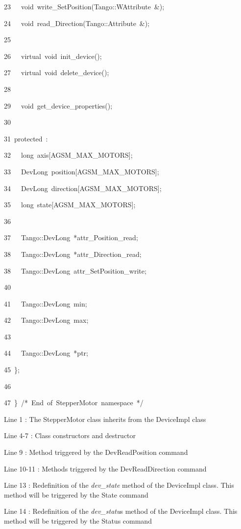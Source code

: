 \begin{lyxcode}
23~~~void~write\_SetPosition(Tango::WAttribute~\&);

24~~~void~read\_Direction(Tango::Attribute~\&);

25~

26~~~virtual~void~init\_device();

27~~~virtual~void~delete\_device();

28~

29~~~void~get\_device\_properties();

30~

31~protected~:~

32~~~long~axis{[}AGSM\_MAX\_MOTORS{]};

33~~~DevLong~position{[}AGSM\_MAX\_MOTORS{]};

34~~~DevLong~direction{[}AGSM\_MAX\_MOTORS{]};

35~~~long~state{[}AGSM\_MAX\_MOTORS{]};

36~

37~~~Tango::DevLong~{*}attr\_Position\_read;

38~~~Tango::DevLong~{*}attr\_Direction\_read;

38~~~Tango::DevLong~attr\_SetPosition\_write;

40~

41~~~Tango::DevLong~min;

42~~~Tango::DevLong~max;

43~

44~~~Tango::DevLong~{*}ptr;

45~\};

46~

47~\}~/{*}~End~of~StepperMotor~namespace~{*}/
\end{lyxcode}


Line 1 : The StepperMotor class inherits from the DeviceImpl class

Line 4-7 : Class constructors and destructor

Line 9 : Method triggered by the DevReadPosition command

Line 10-11 : Methods triggered by the DevReadDirection command

Line 13 : Redefinition of the \emph{dev\_state}
method of the DeviceImpl class. This method will be triggered by the
State command

Line 14 : Redefinition of the \emph{dev\_statu}s
method of the DeviceImpl class. This method will be triggered by the
Status command

